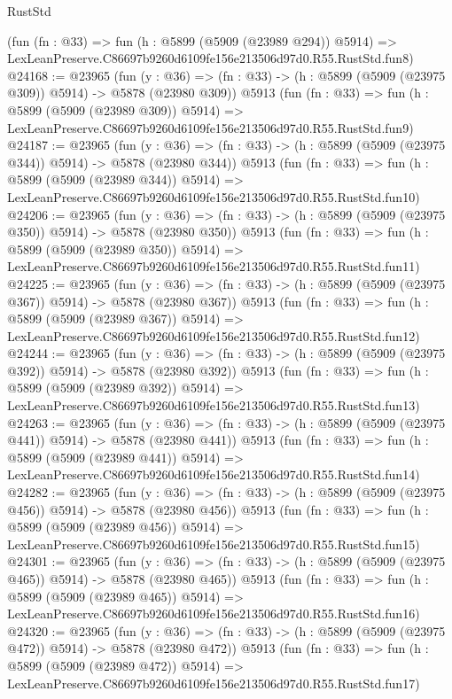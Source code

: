 \begin{lexlean}{RustStd}
\begin{coremodule}
{{    (fun (fn : @33) =>
    fun (h : @5899 (@5909 (@23989 @294)) @5914) =>
    LexLeanPreserve.C86697b9260d6109fe156e213506d97d0.R55.RustStd.fun8)
@24168 := @23965
    (fun (y : @36) => (fn : @33) -> (h : @5899 (@5909 (@23975 @309)) @5914) -> @5878 (@23980 @309))
    @5913
    (fun (fn : @33) =>
    fun (h : @5899 (@5909 (@23989 @309)) @5914) =>
    LexLeanPreserve.C86697b9260d6109fe156e213506d97d0.R55.RustStd.fun9)
@24187 := @23965
    (fun (y : @36) => (fn : @33) -> (h : @5899 (@5909 (@23975 @344)) @5914) -> @5878 (@23980 @344))
    @5913
    (fun (fn : @33) =>
    fun (h : @5899 (@5909 (@23989 @344)) @5914) =>
    LexLeanPreserve.C86697b9260d6109fe156e213506d97d0.R55.RustStd.fun10)
@24206 := @23965
    (fun (y : @36) => (fn : @33) -> (h : @5899 (@5909 (@23975 @350)) @5914) -> @5878 (@23980 @350))
    @5913
    (fun (fn : @33) =>
    fun (h : @5899 (@5909 (@23989 @350)) @5914) =>
    LexLeanPreserve.C86697b9260d6109fe156e213506d97d0.R55.RustStd.fun11)
@24225 := @23965
    (fun (y : @36) => (fn : @33) -> (h : @5899 (@5909 (@23975 @367)) @5914) -> @5878 (@23980 @367))
    @5913
    (fun (fn : @33) =>
    fun (h : @5899 (@5909 (@23989 @367)) @5914) =>
    LexLeanPreserve.C86697b9260d6109fe156e213506d97d0.R55.RustStd.fun12)
@24244 := @23965
    (fun (y : @36) => (fn : @33) -> (h : @5899 (@5909 (@23975 @392)) @5914) -> @5878 (@23980 @392))
    @5913
    (fun (fn : @33) =>
    fun (h : @5899 (@5909 (@23989 @392)) @5914) =>
    LexLeanPreserve.C86697b9260d6109fe156e213506d97d0.R55.RustStd.fun13)
@24263 := @23965
    (fun (y : @36) => (fn : @33) -> (h : @5899 (@5909 (@23975 @441)) @5914) -> @5878 (@23980 @441))
    @5913
    (fun (fn : @33) =>
    fun (h : @5899 (@5909 (@23989 @441)) @5914) =>
    LexLeanPreserve.C86697b9260d6109fe156e213506d97d0.R55.RustStd.fun14)
@24282 := @23965
    (fun (y : @36) => (fn : @33) -> (h : @5899 (@5909 (@23975 @456)) @5914) -> @5878 (@23980 @456))
    @5913
    (fun (fn : @33) =>
    fun (h : @5899 (@5909 (@23989 @456)) @5914) =>
    LexLeanPreserve.C86697b9260d6109fe156e213506d97d0.R55.RustStd.fun15)
@24301 := @23965
    (fun (y : @36) => (fn : @33) -> (h : @5899 (@5909 (@23975 @465)) @5914) -> @5878 (@23980 @465))
    @5913
    (fun (fn : @33) =>
    fun (h : @5899 (@5909 (@23989 @465)) @5914) =>
    LexLeanPreserve.C86697b9260d6109fe156e213506d97d0.R55.RustStd.fun16)
@24320 := @23965
    (fun (y : @36) => (fn : @33) -> (h : @5899 (@5909 (@23975 @472)) @5914) -> @5878 (@23980 @472))
    @5913
    (fun (fn : @33) =>
    fun (h : @5899 (@5909 (@23989 @472)) @5914) =>
    LexLeanPreserve.C86697b9260d6109fe156e213506d97d0.R55.RustStd.fun17)
}}
\end{coremodule}
\end{lexlean}
